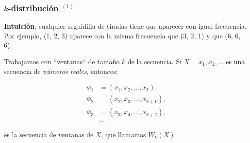 \documentclass[t, 10pt, mathserif]{beamer}
\begin{document}

\begin{frame}
  \frametitle{$k$-distribución {$^{(1)}$}}


  \textbf{Intuición}: cualquier seguidilla de tiradas tiene que aparecer con igual frecuencia. Por ejemplo, (1, 2, 3) aparece con la misma frecuencia que (3, 2, 1) y que (6, 6, 6).
  \pause

  Trabajamos con ``ventanas`` de tamaño $k$ de la secuencia. Si $X = x_1, x_2, \dots$ es una secuencia de \textit{números reales}, entonces:
  \pause

  \vspace{-0.3cm}
  \begin{equation*}
    \begin{aligned}
        \bar{w}_1 & = (x_1, x_2, \dots, x_k      ), \\
        \bar{w}_2 & = (x_2, x_3, \dots, x_{k + 1}), \\
        \bar{w}_3 & = (x_3, x_4, \dots, x_{k + 2}), \\
            & \dots
    \end{aligned}
  \end{equation*}

  es la secuencia de ventanas de $X$, que llamamos $W_k(X)$.
\end{frame}

\end{document}
